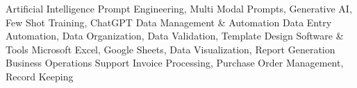 \begin{cvskills}
  \cvskill
    {Artificial Intelligence} %
    {Prompt Engineering, Multi Modal Prompts, Generative AI, Few Shot Training, ChatGPT } %
  \cvskill
    {Data Management \& Automation} %
    {Data Entry Automation, Data Organization, Data Validation, Template Design} %
  \cvskill
    {Software \& Tools} %
    {Microsoft Excel, Google Sheets, Data Visualization, Report Generation} %
  \cvskill
    {Business Operations Support} %
    {Invoice Processing, Purchase Order Management, Record Keeping} %

\end{cvskills}
